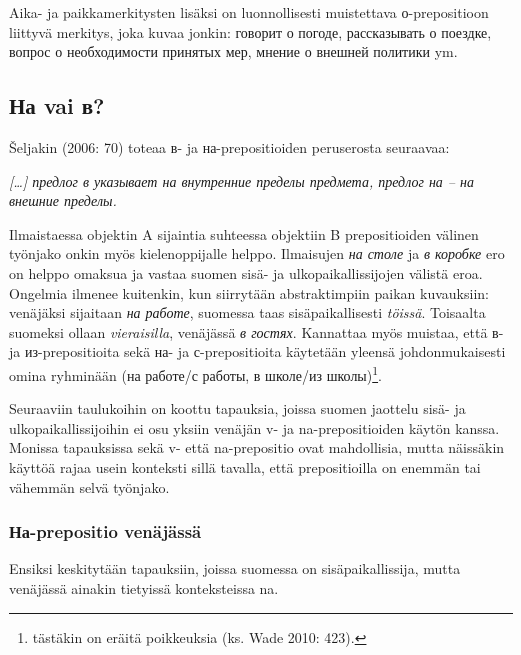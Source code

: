 \documentclass[]{scrartcl}
\begin{document}
Aika- ja paikkamerkitysten lisäksi on luonnollisesti muistettava
о-prepositioon liittyvä merkitys, joka kuvaa jonkin: говорит о погоде,
рассказывать о поездке, вопрос о необходимости принятых мер, мнение о
внешней политики ym.

\subsection{На vai в?}\label{ux43dux430-vai-ux432}

Šeljakin (2006: 70) toteaa в- ja на-prepositioiden peruserosta
seuraavaa:

\emph{{[}\ldots{}{]} предлог в указывает на внутренние пределы предмета,
предлог на -- на внешние пределы.}

Ilmaistaessa objektin A sijaintia suhteessa objektiin B prepositioiden
välinen työnjako onkin myös kielenoppijalle helppo. Ilmaisujen \emph{на
столе} ja \emph{в коробке} ero on helppo omaksua ja vastaa suomen sisä-
ja ulkopaikallissijojen välistä eroa. Ongelmia ilmenee kuitenkin, kun
siirrytään abstraktimpiin paikan kuvauksiin: venäjäksi sijaitaan
\emph{на работе}, suomessa taas sisäpaikallisesti \emph{töissä}.
Toisaalta suomeksi ollaan \emph{vieraisilla}, venäjässä \emph{в гостях}.
Kannattaa myös muistaa, että в- ja из-prepositioita sekä на- ja
с-prepositioita käytetään yleensä johdonmukaisesti omina ryhminään (на
работе/с работы, в школе/из школы)\footnote{tästäkin on eräitä
  poikkeuksia (ks. Wade 2010: 423).}.

Seuraaviin taulukoihin on koottu tapauksia, joissa suomen jaottelu sisä-
ja ulkopaikallissijoihin ei osu yksiin venäjän v- ja na-prepositioiden
käytön kanssa. Monissa tapauksissa sekä v- että na-prepositio ovat
mahdollisia, mutta näissäkin käyttöä rajaa usein konteksti sillä
tavalla, että prepositioilla on enemmän tai vähemmän selvä työnjako.

\subsubsection{На-prepositio
venäjässä}\label{ux43dux430-prepositio-venuxe4juxe4ssuxe4}

Ensiksi keskitytään tapauksiin, joissa suomessa on sisäpaikallissija,
mutta venäjässä ainakin tietyissä konteksteissa na.
\end{document}
